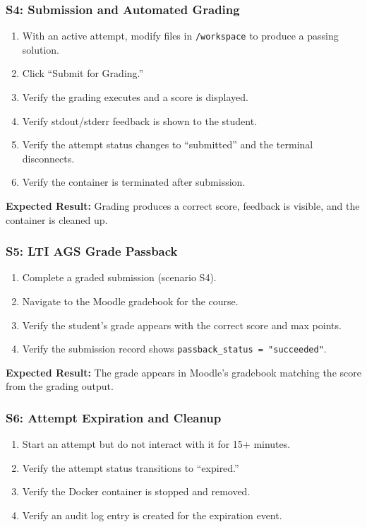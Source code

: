 \documentclass[12pt, letterpaper]{article}
\begin{document}
\subsubsection{S4: Submission and Automated Grading}

\begin{enumerate}
    \item With an active attempt, modify files in \texttt{/workspace} to produce a passing solution.
    \item Click ``Submit for Grading.''
    \item Verify the grading executes and a score is displayed.
    \item Verify stdout/stderr feedback is shown to the student.
    \item Verify the attempt status changes to ``submitted'' and the terminal disconnects.
    \item Verify the container is terminated after submission.
\end{enumerate}

\textbf{Expected Result:} Grading produces a correct score, feedback is visible, and the container is cleaned up.

\subsubsection{S5: LTI AGS Grade Passback}

\begin{enumerate}
    \item Complete a graded submission (scenario S4).
    \item Navigate to the Moodle gradebook for the course.
    \item Verify the student's grade appears with the correct score and max points.
    \item Verify the submission record shows \texttt{passback\_status = "succeeded"}.
\end{enumerate}

\textbf{Expected Result:} The grade appears in Moodle's gradebook matching the score from the grading output.

\subsubsection{S6: Attempt Expiration and Cleanup}

\begin{enumerate}
    \item Start an attempt but do not interact with it for 15+ minutes.
    \item Verify the attempt status transitions to ``expired.''
    \item Verify the Docker container is stopped and removed.
    \item Verify an audit log entry is created for the expiration event.
\end{enumerate}
\end{document}
